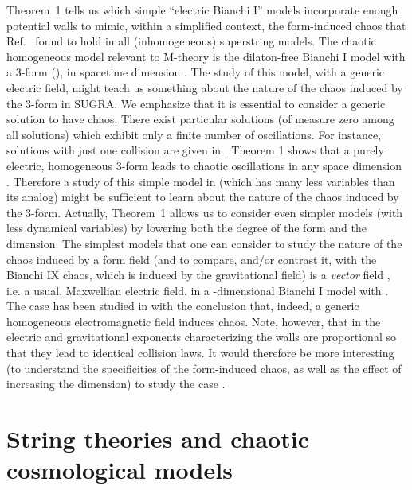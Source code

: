 \documentclass[a4paper,12pt]{article}
\begin{document}
Theorem~1 tells us which simple ``electric Bianchi I'' models 
incorporate enough potential walls to mimic, within a simplified 
context, the form-induced chaos that Ref.~\cite{dh1} found to hold in 
all (inhomogeneous) superstring models. The chaotic 
homogeneous model relevant to M-theory
is the dilaton-free Bianchi I model with a 3-form (\coordHE{}), 
in spacetime dimension \coordHE{}. The study of this model, with
a generic electric field,  might teach 
us something about the nature of the chaos induced by the 3-form in 
SUGRA\coordHE{}. We
emphasize that it is essential to consider a generic solution to have
chaos. There exist particular solutions (of measure zero among all
solutions) which exhibit only a finite number of oscillations.  For instance,
solutions with just one collision are given in \cite{Demaretetal}.
Theorem 1 shows  that a purely electric,
homogeneous 3-form leads to chaotic oscillations in any space dimension 
\coordHE{}. Therefore a study of this simple model  in \coordHE{} 
(which has many less variables than its \coordHE{} analog) might be 
sufficient to learn about the nature of the chaos induced by the 
3-form. Actually, Theorem~1 allows us to consider even simpler models 
(with less dynamical variables) by lowering both the degree of the form and the
dimension. The simplest models that one can consider
to study the nature of the chaos induced by a form field (and to 
compare, and/or contrast it, with the Bianchi IX chaos, which is 
induced by the gravitational field) is 
 a {\it vector} field \coordHE{}, i.e. a usual, Maxwellian 
electric field, in a \coordHE{}-dimensional Bianchi I model with \coordHE{} \cite{BK81}. 
The case \coordHE{} has been studied in \cite{Jantzen,Leblanc,Weaver} with the conclusion
that, indeed, a generic homogeneous electromagnetic field induces chaos.
Note, however, that in \coordHE{}  the electric and
gravitational exponents characterizing the walls are proportional
so that they lead to identical collision laws. It would therefore be more
interesting (to understand the specificities of the form-induced chaos, as
well as the effect of increasing the dimension)
 to study the case \coordHE{}. 

\section{String theories and chaotic cosmological models}
\end{document}
